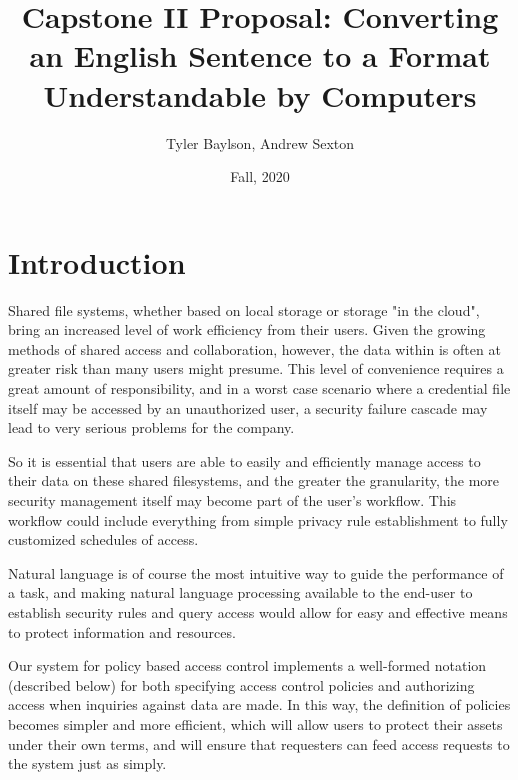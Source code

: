 \documentclass[12pt]{article}
\begin{document}

\title{Capstone II Proposal: Converting an English Sentence to a Format Understandable by Computers}
\author{Tyler Baylson, Andrew Sexton}
\date{Fall, 2020}
\maketitle

\section{Introduction}
Shared file systems, whether based on local storage or storage "in the cloud", bring an increased level of work efficiency from their users. Given the growing methods of shared access and collaboration, however, the data within is often at greater risk than many users might presume. This level of convenience requires a great amount of responsibility, and in a worst case scenario where a credential file itself may be accessed by an unauthorized user, a security failure cascade may lead to very serious problems for the company.

So it is essential that users are able to easily and efficiently manage access to their data on these shared filesystems, and the greater the granularity, the more security management itself may become part of the user's workflow. This workflow could include everything from simple privacy rule establishment to fully customized schedules of access.

Natural language is of course the most intuitive way to guide the performance of a task, and making natural language processing available to the end-user to establish security rules and query access would allow for easy and effective means to protect information and resources. 

Our system for policy based access control implements a well-formed notation (described below) for both specifying access control policies and authorizing access when inquiries against data are made. In this way, the definition of policies becomes simpler and more efficient, which will allow users to protect their assets under their own terms, and will ensure that requesters can feed access requests to the system just as simply.
\end{document}
